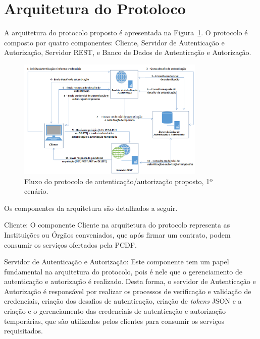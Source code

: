 
\section{Arquitetura do Protoloco}\label{sec:ArqProtocolo}

A arquitetura do protocolo proposto é apresentada na Figura~\ref{fig:arquiteturaprotocolo}. O protocolo é composto por quatro componentes: Cliente, Servidor de Autenticação e Autorização, Servidor REST, e Banco de Dados de Autenticação e Autorização.

\begin{figure}[!htb]
    \centering
    \includegraphics[width=0.8\textwidth]{arquitetura_protocolo.png}
    \caption{Fluxo do protocolo de autenticação/autorização proposto, 1º cenário.}
    \label{fig:arquiteturaprotocolo}
\end{figure}

Os componentes da arquitetura são detalhados a seguir.

Cliente: O componente Cliente na arquitetura do protocolo representa as Instituições ou Órgãos conveniados, que após firmar um contrato, podem consumir os serviços ofertados pela PCDF.

Servidor de Autenticação e Autorização: Este componente tem um papel fundamental na arquitetura do protocolo, pois é nele que o gerenciamento de autenticação e autorização é realizado. Desta forma, o servidor de Autenticação e Autorização é responsável por realizar os processos de verificação e validação de credenciais, criação dos desafios de autenticação, criação de \emph{tokens} JSON e a criação e o gerenciamento das credenciais de autenticação e autorização temporárias, que são utilizados pelos clientes para consumir os serviços requisitados.

